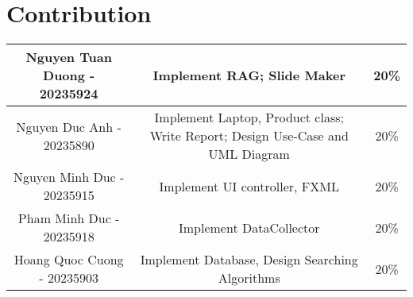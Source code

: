 \documentclass{article}
\begin{document}
\setcounter{page}{2} %

\section*{Contribution}
\begin{table}[H]
\renewcommand{\arraystretch}{2}
\noindent 
\raggedright
\resizebox{\textwidth}{!}
{
\begin{tabular}{|c|c|c|}
    \hline
    Nguyen Tuan Duong - 20235924 & Implement RAG; Slide Maker & 20\% \\
    \hline
    Nguyen Duc Anh - 20235890 & Implement Laptop, Product class; Write Report; Design Use-Case and UML Diagram & 20\% \\
    \hline
    Nguyen Minh Duc - 20235915 & Implement UI controller, FXML & 20\% \\
    \hline
    Pham Minh Duc - 20235918 & Implement DataCollector & 20\% \\
    \hline
    Hoang Quoc Cuong - 20235903 & Implement Database, Design Searching Algorithms & 20\% \\
    \hline
\end{tabular}
}
\end{table}

\end{document}

